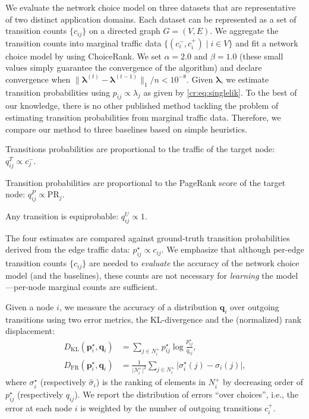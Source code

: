 We evaluate the network choice model on three datasets that are representative of two distinct application domains.
Each dataset can be represented as a set of transition counts $\{ c_{ij} \}$ on a directed graph $G = (V,E)$.
We aggregate the transition counts into marginal traffic data $\{ (c^-_i, c^+_i) \mid i \in V \}$ and fit a network choice model by using ChoiceRank.
We set $\alpha = 2.0$ and $\beta = 1.0$ (these small values simply guarantee the convergence of the algorithm) and declare convergence when $\lVert \bm{\lambda}^{(t)} - \bm{\lambda}^{(t-1)} \rVert_1 / n < 10^{-8}$.
Given $\bm{\lambda}$, we estimate transition probabilities using $p_{ij} \propto \lambda_j$ as given by \eqref{cr:eq:singlelik}.
To the best of our knowledge, there is no other published method tackling the problem of estimating transition probabilities from marginal traffic data.
Therefore, we compare our method to three baselines based on simple heuristics.
\begin{description}[topsep=1ex,itemsep=0ex]
\item[Traffic] Transitions probabilities are proportional to the traffic of the target node: $q_{ij}^T \propto c_j^{-}$.
\item[PageRank] Transition probabilities are proportional to the PageRank score of the target node: $q_{ij}^P \propto \text{PR}_j$.
\item[Uniform] Any transition is equiprobable: $q_{ij}^U \propto 1$.
\end{description}
The four estimates are compared against ground-truth transition probabilities derived from the edge traffic data: $p_{ij}^\star \propto c_{ij}$.
We emphasize that although per-edge transition counts $\{c_{ij}\}$ are needed to \emph{evaluate} the accuracy of the network choice model (and the baselines), these counts are not necessary for \emph{learning} the model---per-node marginal counts are sufficient.

Given a node $i$, we measure the accuracy of a distribution $\bm{q}_i$ over outgoing transitions using two error metrics, the KL-divergence and the (normalized) rank displacement:
\begin{align*}
D_{\text{KL}}(\bm{p}_i^\star, \bm{q}_i) &= \sum_{j \in N^+_i} p^\star_{ij} \log \frac{p^\star_{ij}}{q_{ij}}, \\
D_{\text{FR}}(\bm{p}_i^\star, \bm{q}_i) &= \frac{1}{\vert N^+_i \vert^2} \sum_{j \in N^+_i} \vert \sigma^\star_i(j) - \hat{\sigma}_i(j) \vert,
\end{align*}
where $\sigma^\star_i$ (respectively $\hat{\sigma}_i$) is the ranking of elements in $N^+_i$ by decreasing order of $p^\star_{ij}$ (respectively $q_{ij}$).
We report the distribution of errors ``over choices'', i.e., the error at each node $i$ is weighted by the number of outgoing transitions $c^+_i$.


